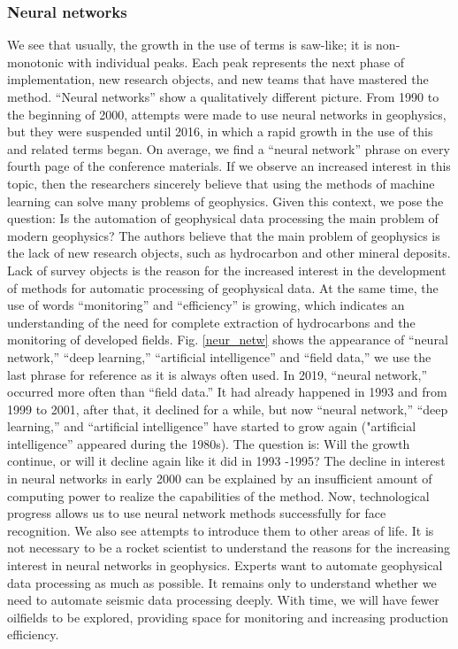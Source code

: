 \documentclass[geosciences,article,submit,moreauthors,pdftex]{Definitions/mdpi}
\begin{document}
\subsubsection{Neural networks} 
We see that usually, the growth in the use of terms is saw-like; it is non-monotonic with individual peaks. Each peak represents the next phase of implementation, new research objects, and new teams that have mastered the method. ``Neural networks'' show a qualitatively different picture. From 1990 to the beginning of 2000, attempts were made to use neural networks in geophysics, but they were suspended until 2016, in which a rapid growth in the use of this and related terms began. On average, we find a ``neural network'' phrase on every fourth page of the conference materials. If we observe an increased interest in this topic, then the researchers sincerely believe that using the methods of machine learning can solve many problems of geophysics. Given this context, we pose the question: Is the automation of geophysical data processing the main problem of modern geophysics? The authors believe that the main problem of geophysics is the lack of new research objects, such as hydrocarbon and other mineral deposits. Lack of survey objects is the reason for the increased interest in the development of methods for automatic processing of geophysical data. At the same time, the use of words ``monitoring'' and ``efficiency'' is growing, which indicates an understanding of the need for complete extraction of hydrocarbons and the monitoring of developed fields. Fig. \ref{neur_netw} shows the appearance of ``neural network,'' ``deep learning,'' ``artificial intelligence'' and ``field data,'' we use the last phrase for reference as it is always often used. In 2019, ``neural network,'' occurred more often than ``field data.'' It had already happened in 1993 and from 1999 to 2001, after that, it declined for a while, but now ``neural network,'' ``deep learning,'' and ``artificial intelligence'' have started to grow again ("artificial intelligence'' appeared during the 1980s). The question is: Will the growth continue, or will it decline again like it did in 1993 -1995? The decline in interest in neural networks in early 2000 can be explained by an insufficient amount of computing power to realize the capabilities of the method. Now, technological progress allows us to use neural network methods successfully for face recognition. We also see attempts to introduce them to other areas of life. It is not necessary to be a rocket scientist to understand the reasons for the increasing interest in neural networks in geophysics. Experts want to automate geophysical data processing as much as possible. It remains only to understand whether we need to automate seismic data processing deeply. With time, we will have fewer oilfields to be explored, providing space for monitoring and increasing production efficiency.
\end{document}
